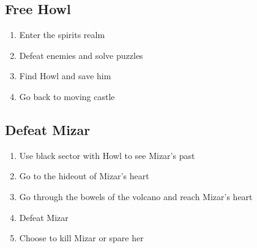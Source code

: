 \subsection{Free Howl}
\begin{enumerate}
\item Enter the spirits realm
\item Defeat enemies and solve puzzles
\item Find Howl and save him
\item Go back to moving castle
\end{enumerate}

\subsection{Defeat Mizar}
\begin{enumerate}
\item Use black sector with Howl to see Mizar’s past
\item Go to the hideout of Mizar’s heart
\item Go through the bowels of the volcano and reach Mizar’s heart
\item Defeat Mizar
\item Choose to kill Mizar or spare her
\end{enumerate}
